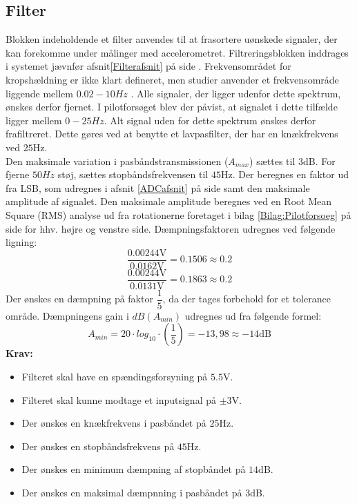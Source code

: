 \subsection{Filter}\label{FilterAfs}
Blokken indeholdende et filter anvendes til at frasortere uønskede signaler, der kan forekomme under målinger med accelerometret. Filtreringsblokken inddrages i systemet jævnfør afsnit\ref{Filterafsnit} på side \pageref{Filterafsnit}. Frekvensområdet for kropshældning er ikke klart defineret, men studier anvender et frekvensområde liggende mellem $0.02-10Hz$ \cite{Martinez-Mendez2011}. Alle signaler, der ligger udenfor dette spektrum, ønskes derfor fjernet. I pilotforsøget blev der påvist, at signalet i dette tilfælde ligger mellem $0-25Hz$. Alt signal uden for dette spektrum ønskes derfor frafiltreret. Dette gøres ved at benytte et lavpasfilter, der har en knækfrekvens ved $25$Hz. \\
Den maksimale variation i pasbåndstransmissionen ($A_{max}$) sættes til $3$dB. For fjerne $50Hz$ støj, sættes stopbåndsfrekvensen til $45$Hz. Der beregnes en faktor ud fra LSB, som udregnes i afsnit \ref{ADCafsnit} på side \pageref{ADCafsnit} samt den maksimale amplitude af signalet. Den maksimale amplitude beregnes ved en Root Mean Square (RMS) analyse ud fra rotationerne foretaget i bilag \ref{Bilag:Pilotforsoeg} på side \pageref{Bilag:Pilotforsoeg} for hhv. højre og venstre side. Dæmpningsfaktoren udregnes ved følgende ligning:
\begin{equation}
\label{eq:daempningsfaktor}
\dfrac{0.00244\text{V}}{0.0162\text{V}} = 0.1506 \approx 0.2 
\end{equation}
\begin{equation}
\dfrac{0.00244\text{V}}{0.0131\text{V}} = 0.1863  \approx 0.2
\end{equation}
Der ønskes en dæmpning på faktor $\dfrac{1}{5}$, da der tages forbehold for et tolerance område. Dæmpningens gain i $dB(A_{min})$ udregnes ud fra følgende formel:   
\begin{equation}
\label{eq:daempningsfaktoridB}
A_{min}=20 \cdot log_{10} \cdot (\frac{1}{5}) = -13,98 \approx -14\text{dB}
\end{equation}
\textbf{Krav:}
\begin{itemize}
	\item Filteret skal have en spændingsforsyning på $5.5$V.
	\item Filteret skal kunne modtage et inputsignal på $\pm3$V.
	\item Der ønskes en knækfrekvens i pasbåndet på $25$Hz.
	\item Der ønskes en stopbåndsfrekvens på $45$Hz.
	\item Der ønskes en minimum dæmpning af stopbåndet på $14$dB.
	\item Der ønskes en maksimal dæmpnning i pasbåndet på $3$dB.
\end{itemize}
